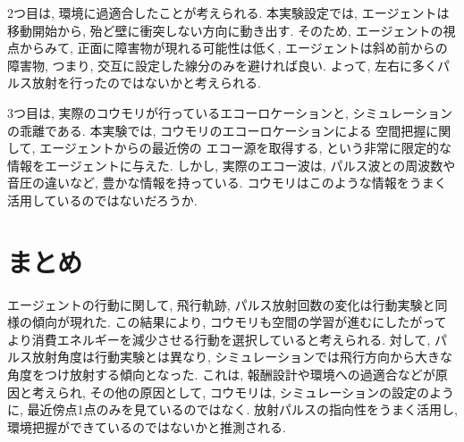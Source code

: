 \documentclass[../main]{subfiles}
\begin{document}
2つ目は, 環境に過適合したことが考えられる.
本実験設定では, エージェントは移動開始から, 
殆ど壁に衝突しない方向に動き出す.
そのため, エージェントの視点からみて, 
正面に障害物が現れる可能性は低く, 
エージェントは斜め前からの障害物, つまり, 
交互に設定した線分のみを避ければ良い.
よって, 左右に多くパルス放射を行ったのではないかと考えられる.

3つ目は, 実際のコウモリが行っているエコーロケーションと, 
シミュレーションの乖離である.
本実験では, コウモリのエコーロケーションによる
空間把握に関して, エージェントからの最近傍の
エコー源を取得する, という非常に限定的な情報をエージェントに与えた.
しかし, 実際のエコー波は, パルス波との周波数や音圧の違いなど, 
豊かな情報を持っている. 
コウモリはこのような情報をうまく活用しているのではないだろうか.


\section{まとめ}
エージェントの行動に関して, 飛行軌跡, 
パルス放射回数の変化は行動実験と同様の傾向が現れた.
この結果により,
コウモリも空間の学習が進むにしたがって
より消費エネルギーを減少させる行動を選択していると考えられる.
対して, パルス放射角度は行動実験とは異なり, 
シミュレーションでは飛行方向から大きな角度をつけ放射する傾向となった.
これは, 報酬設計や環境への過適合などが原因と考えられ, 
その他の原因として, コウモリは, シミュレーションの設定のように, 
最近傍点1点のみを見ているのではなく.
放射パルスの指向性をうまく活用し, 
環境把握ができているのではないかと推測される.

    
\end{document}
